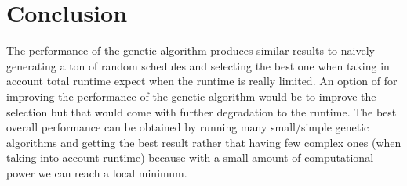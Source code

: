 \documentclass{article}
\begin{document}
\section*{Conclusion}
The performance of the genetic algorithm produces similar results to naively generating a ton of random schedules and selecting the best one when taking in account total runtime expect when the runtime is really limited.
An option of for improving the performance of the genetic algorithm would be to improve the selection but that would come with further degradation to the runtime.
The best overall performance can be obtained by running many small/simple genetic algorithms and getting the best result rather that having few complex ones (when taking into account runtime) because with a small amount of computational power we can reach a local minimum.
\end{document}
